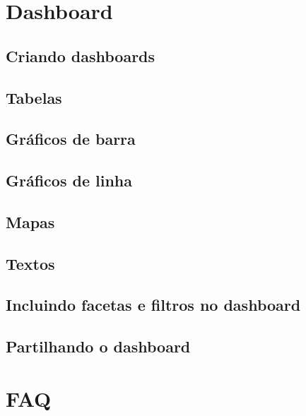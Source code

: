 \documentclass[]{book}
\begin{document}
\hypertarget{dashbord}{%
\chapter{Dashboard}\label{dashbord}}

\hypertarget{criando-dashboards}{%
\section{Criando dashboards}\label{criando-dashboards}}

\hypertarget{tabelas}{%
\section{Tabelas}\label{tabelas}}

\hypertarget{graficos-de-barra}{%
\section{Gráficos de barra}\label{graficos-de-barra}}

\hypertarget{graficos-de-linha}{%
\section{Gráficos de linha}\label{graficos-de-linha}}

\hypertarget{mapas}{%
\section{Mapas}\label{mapas}}

\hypertarget{textos}{%
\section{Textos}\label{textos}}

\hypertarget{incluindo-facetas-e-filtros-no-dashboard}{%
\section{Incluindo facetas e filtros no dashboard}\label{incluindo-facetas-e-filtros-no-dashboard}}

\hypertarget{partilhando-o-dashboard}{%
\section{Partilhando o dashboard}\label{partilhando-o-dashboard}}

\hypertarget{faq}{%
\chapter{FAQ}\label{faq}}


\end{document}
